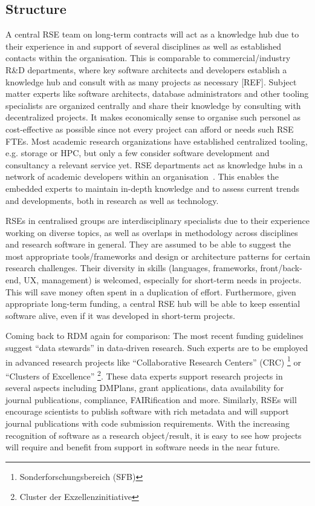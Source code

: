 \documentclass[a4paper]{article}
\begin{document}
\subsection{Structure}

A central RSE team on long-term contracts will act as a knowledge hub due to their experience in and support of several disciplines as well as established contacts within the organisation.
This is comparable to commercial/industry R\&D departments, where key software architects and developers establish a knowledge hub and consult with as many projects as necessary [REF].
Subject matter experts like software architects, database administrators and other tooling specialists are organized centrally and share their knowledge by consulting with decentralized projects. It makes economically sense to organise such personel as cost-effective as possible since not every project can afford or needs such RSE FTEs. 
Most academic research organizations have established centralized tooling, e.g. storage or HPC, but only a few consider software development and consultancy a relevant service yet. 
RSE departments act as knowledge hubs in a network of academic developers within an organisation~\autocite{Elsholz2006}.
This enables the embedded experts to maintain in-depth knowledge and to assess current trends and developments, both in research as well as technology.

RSEs in centralised groups are interdisciplinary specialists due to their experience working on diverse topics, as well as overlaps in methodology across disciplines and research software in general.
They are assumed to be able to suggest the most appropriate tools/frameworks and design or architecture patterns for certain research challenges.
Their diversity in skills (languages, frameworks, front/back-end, UX, management) is welcomed, especially for short-term needs in projects.
This will save money often spent in a duplication of effort.
Furthermore, given appropriate long-term funding, a central RSE hub will be able to keep essential software alive, even if it was developed in short-term projects.


Coming back to RDM again for comparison: The most recent funding guidelines suggest “data stewards” in data-driven research.
Such experts are to be employed in advanced research projects like “Collaborative Research Centers” (CRC) \footnote{Sonderforschungsbereich (SFB)} or “Clusters of Excellence”
\footnote{Cluster der Exzellenzinitiative}.
These data experts support research projects in several aspects including DMPlans, grant applications, data availability for journal publications, compliance, FAIRification and more.
Similarly, RSEs will encourage scientists to publish software with rich metadata and will support journal publications with code submission requirements.
With the increasing recognition of software as a research object/result, it is easy to see how projects will require and benefit from support in software needs in the near future.
\end{document}
